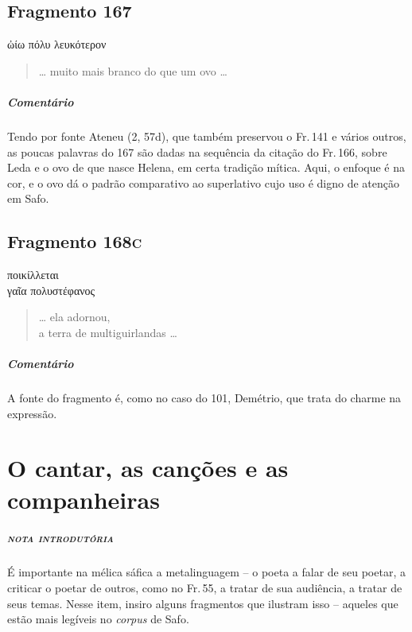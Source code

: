 \section{Fragmento 167}

\begin{gkverse}
ὠίω πόλυ λευκότερον
\end{gkverse}

\begin{verse}
\ldots{} muito mais branco do que um ovo \ldots{}
\end{verse}

{\paragraph{Comentário} Tendo por fonte Ateneu (2, 57d), que também preservou o Fr.\,141 e vários outros, as poucas palavras do 167 são dadas na sequência da citação do Fr.\,166, sobre Leda e o ovo de que nasce Helena, em certa tradição mítica. Aqui, o enfoque é na cor, e o ovo dá o padrão comparativo ao superlativo cujo uso é digno de atenção em Safo.}


\section{Fragmento 168\textsc{c}}

\begin{gkverse}
ποικίλλεται\\
    γαῖα πολυστέφανος 
\end{gkverse}

\begin{verse}
\ldots{} ela adornou,\\
a terra de multiguirlandas \ldots{}
\end{verse}

{\paragraph{Comentário} A fonte do fragmento é, como no caso do 101, Demétrio, que trata do charme na expressão.}



\chapter[O cantar, as canções e as companheiras]{O cantar, as canções e as companheiras}



\paragraph{\textsc{nota introdutória}}
É importante na mélica sáfica a metalinguagem -- o poeta a falar de seu
poetar, a criticar o poetar de outros, como no Fr.\,55, a tratar de sua
audiência, a tratar de seus temas. Nesse item, insiro alguns fragmentos que
ilustram isso -- aqueles que estão mais legíveis no \textit{corpus} de Safo.


